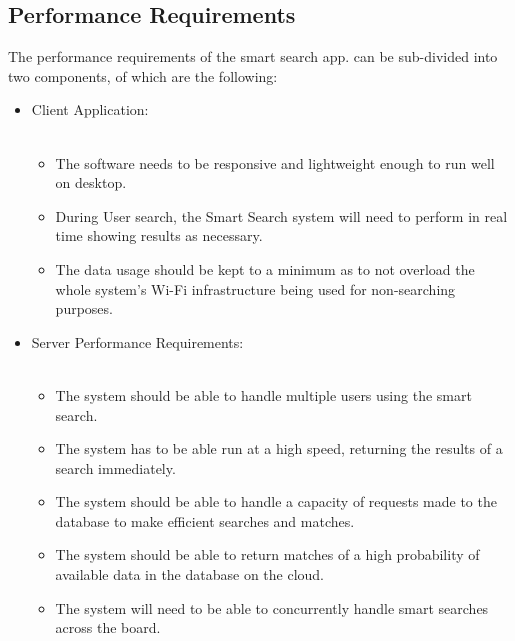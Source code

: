 \documentclass[a4paper,10pt]{article}
\begin{document}
	\subsection{Performance Requirements}
	The performance requirements of the smart search app. can be sub-divided into two components, of which are the following:
	\begin{itemize}
	\item Client Application:\\\\

		\begin{itemize}
		\item The software needs to be responsive and lightweight enough to run well on desktop.\\
		\item During User search, the Smart Search system will need to perform in real time showing results as necessary.\\
		\item The data usage should be kept to a minimum as to not overload the whole system's Wi-Fi infrastructure being used for non-searching purposes.\\
		\end{itemize}

	\item Server Performance Requirements:\\\\

		\begin{itemize}
		\item The system should be able to handle multiple users using the smart search.\\
		\item The system has to be able run at a high speed, returning the results of a search immediately.\\
		\item The system should be able to handle a capacity of requests made to the database to make efficient searches and matches. \\
		\item The system should be able to return matches of a high probability of available data in the database on the cloud.\\
		\item The system will need to be able to concurrently handle smart searches across the board.
		\end{itemize}
	\end{itemize}
\end{document}
